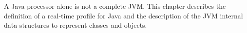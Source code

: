A Java processor alone is not a complete JVM. This chapter describes
the definition of a real-time profile for Java and the description of
the JVM internal data structures to represent classes and objects.
